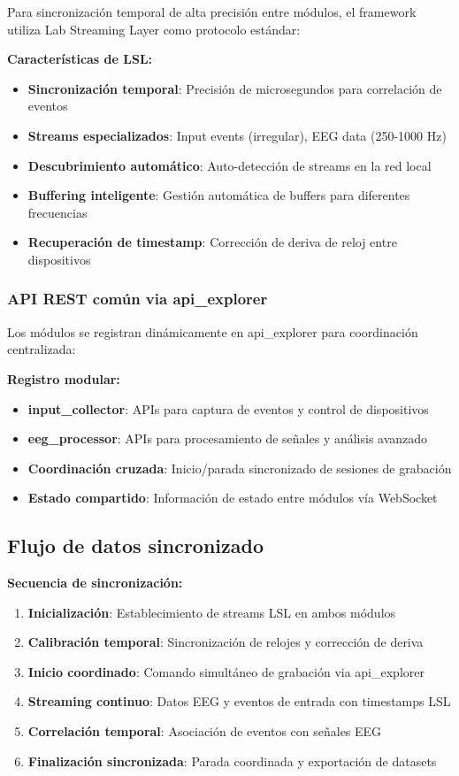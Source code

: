 Para sincronización temporal de alta precisión entre módulos, el framework utiliza Lab Streaming Layer como protocolo estándar:

\textbf{Características de LSL:}
\begin{itemize}
    \item \textbf{Sincronización temporal}: Precisión de microsegundos para correlación de eventos
    \item \textbf{Streams especializados}: Input events (irregular), EEG data (250-1000 Hz)
    \item \textbf{Descubrimiento automático}: Auto-detección de streams en la red local
    \item \textbf{Buffering inteligente}: Gestión automática de buffers para diferentes frecuencias
    \item \textbf{Recuperación de timestamp}: Corrección de deriva de reloj entre dispositivos
\end{itemize}

\subsubsection{API REST común via api\_explorer}

Los módulos se registran dinámicamente en api\_explorer para coordinación centralizada:

\textbf{Registro modular:}
\begin{itemize}
    \item \textbf{input\_collector}: APIs para captura de eventos y control de dispositivos
    \item \textbf{eeg\_processor}: APIs para procesamiento de señales y análisis avanzado
    \item \textbf{Coordinación cruzada}: Inicio/parada sincronizado de sesiones de grabación
    \item \textbf{Estado compartido}: Información de estado entre módulos vía WebSocket
\end{itemize}

\subsection{Flujo de datos sincronizado}
\label{subsec:flujo_datos_sincronizado}

\textbf{Secuencia de sincronización:}
\begin{enumerate}
    \item \textbf{Inicialización}: Establecimiento de streams LSL en ambos módulos
    \item \textbf{Calibración temporal}: Sincronización de relojes y corrección de deriva
    \item \textbf{Inicio coordinado}: Comando simultáneo de grabación via api\_explorer
    \item \textbf{Streaming continuo}: Datos EEG y eventos de entrada con timestamps LSL
    \item \textbf{Correlación temporal}: Asociación de eventos con señales EEG
    \item \textbf{Finalización sincronizada}: Parada coordinada y exportación de datasets
\end{enumerate}

